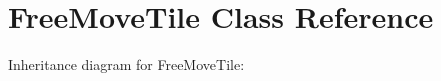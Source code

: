 \hypertarget{classFreeMoveTile}{}\section{Free\+Move\+Tile Class Reference}
\label{classFreeMoveTile}


Inheritance diagram for Free\+Move\+Tile\+:
